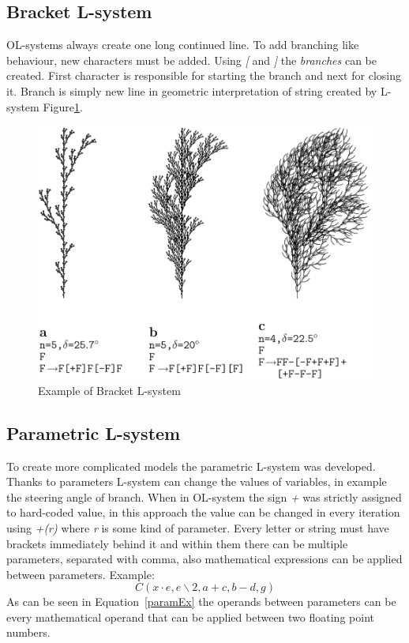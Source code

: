 \documentclass[b5paper,twoside,11pt]{article}
\renewcommand{\figurename}{Figure}
\begin{document}
\subsection{Bracket L-system}
OL-systems always create one long continued line. To add branching like behaviour, new characters must be added. Using \textit{[} and \textit{]} the \textit{branches} can be created. First character is responsible for starting the branch and next for closing it. Branch is simply new line in geometric interpretation of string created by L-system \figurename\ref{branchingL}.
\begin{figure}[!htp]
\centering
  \includegraphics[width=0.7\linewidth]{branchingL}
\caption{Example of Bracket L-system\cite{prusinABOP} \label{branchingL}}
\end{figure}





\subsection{Parametric L-system}
To create more complicated models the parametric L-system was developed. Thanks to parameters L-system can change the values of variables, in example the steering angle of branch. When in OL-system the sign \textit{+} was strictly assigned to hard-coded value, in this approach the value can be changed in every iteration using \textit{+(r)} where \textit{r} is some kind of parameter. Every letter or string must have brackets immediately behind it and within them there can be multiple parameters, separated with comma, also mathematical expressions can be applied between parameters. Example:
\begin{equation}\label{paramEx}
C(x\cdot e,e\backslash 2,a+c,b-d,g)
\end{equation}
As can be seen in Equation~\ref{paramEx} the operands between parameters can be every mathematical operand that can be applied between two floating point numbers.
\end{document}
